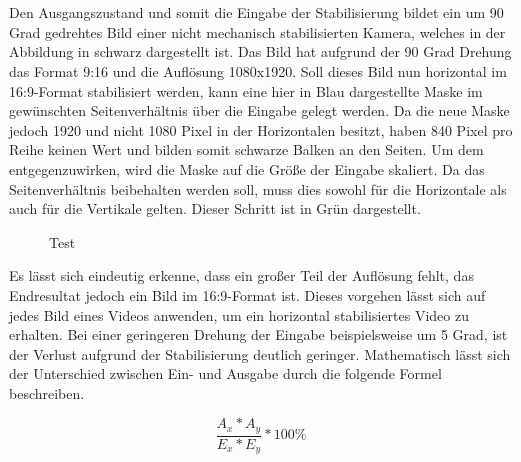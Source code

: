     \\ \\
    Den Ausgangszustand und somit die Eingabe der Stabilisierung bildet ein um 90 Grad gedrehtes Bild einer nicht mechanisch stabilisierten Kamera, welches in der Abbildung in schwarz dargestellt ist. Das Bild hat aufgrund der 90 Grad Drehung das Format 9:16 und die Auflösung 1080x1920. Soll dieses Bild nun horizontal im 16:9-Format stabilisiert werden, kann eine hier in Blau dargestellte Maske im gewünschten Seitenverhältnis über die Eingabe gelegt werden. Da die neue Maske jedoch 1920 und nicht 1080 Pixel in der Horizontalen besitzt, haben 840 Pixel pro Reihe keinen Wert und bilden somit schwarze Balken an den Seiten. Um dem entgegenzuwirken, wird die Maske auf die Größe der Eingabe skaliert. Da das Seitenverhältnis beibehalten werden soll, muss dies sowohl für die Horizontale als auch für die Vertikale gelten. Dieser Schritt ist in Grün dargestellt.

    \begin{figure}[ht]
        \centering
        \def\svgwidth{\linewidth}
        
        \vspace{0.5cm}
        \caption{Test}
        \label{vektorgrafik}
    \end{figure}
    
    Es lässt sich eindeutig erkenne, dass ein großer Teil der Auflösung fehlt, das Endresultat jedoch ein Bild im 16:9-Format ist. Dieses vorgehen lässt sich auf jedes Bild eines Videos anwenden, um ein horizontal stabilisiertes Video zu erhalten. Bei einer geringeren Drehung der Eingabe beispielsweise um 5 Grad, ist der Verlust aufgrund der Stabilisierung deutlich geringer. Mathematisch lässt sich der Unterschied zwischen Ein- und Ausgabe durch die folgende Formel beschreiben.

    \begin{equation}
        \frac{A_x*A_y}{E_x*E_y}*100\%
    \end{equation}

